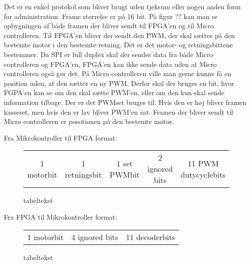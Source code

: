 Det er en enkel protokol som bliver brugt uden tjeksum eller nogen anden form for administration. Frame størrelse er på 16 bit. På figur ?? kan man se opbygningen af både framen der bliver sendt til FPGA’en og til Micro controlleren. Til FPGA’en bliver der sendt den PWM, der skal sættes på den bestemte motor i den bestemte retning. Det er det motor- og retningsbittene bestemmer. Da SPI er full duplex skal der sendes data fra både Micro controlleren og FPGA’en, FPGA’en kan ikke sende data uden at Micro controlleren også gør det. På Micro controlleren ville man gerne kunne få en position uden, at den sætter en ny PWM. Derfor skal der bruges en bit, hvor FGPA’en kan se om den skal sætte PWM’en, eller om den kun skal sende information tilbage. Der er det PWMset bruges til. Hvis den er høj bliver framen kasseret, men hvis den er lav bliver PWM’en sat. Framen der bliver sendt til Micro controlleren er posotionen på den bestemte motor.  


  
Fra Mikrokontroller til FPGA format:
\begin{figure}[th!]
\centering
\begin{tabular}{c|c|c|c|c}
1 motorbit &1 retningsbit & 1 set PWMbit & 2 ignored bits & 11 PWM dutycyclebits
\end{tabular}
\captionsetup{type=figure}
\caption[tekst i indholdsfortegnelsen]{tabeltekst}
\label{tb:protokol1}
\end{figure}

   
  
  Fra FPGA til Mikrokontroller format:
 \begin{figure}[th!]
 \centering
 \begin{tabular}{c|c|c}
 1 motorbit & 4 ignored bits & 11 decoderbits
  
 \end{tabular}
 \captionsetup{type=figure}
 \caption[tekst i indholdsfortegnelsen]{tabeltekst}
 \label{tb:protokol2}
 \end{figure}
